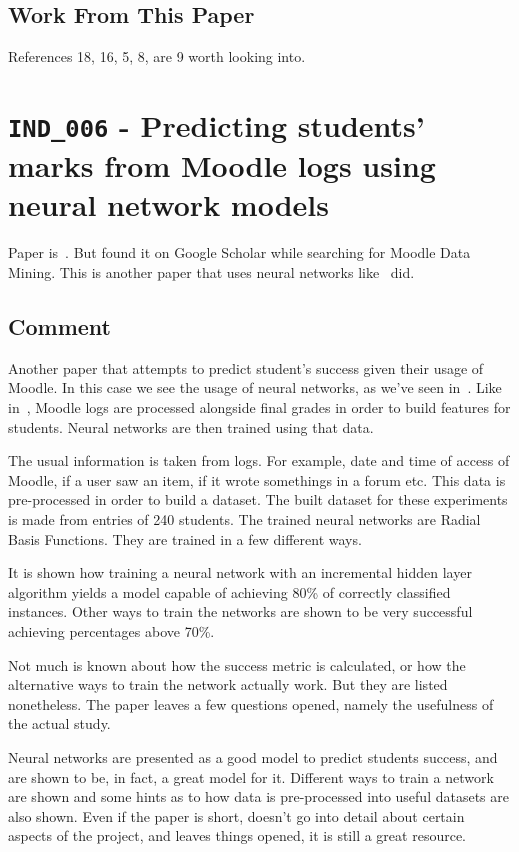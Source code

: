 \subsection{Work From This Paper}

References 18, 16, 5, 8, are 9 worth looking into.

\section{\texttt{IND\_006} - Predicting students' marks from Moodle logs using
neural network models}

Paper is~\cite{ind_006}. But found it on Google Scholar while searching for
Moodle Data Mining. This is another paper that uses neural networks
like~\cite{ind_003} did.

\subsection{Comment}

Another paper that attempts to predict student's success given their usage of
Moodle. In this case we see the usage of neural networks, as we've seen
in~\cite{ind_003}. Like in~\cite{ind_001, ind_002, ind_004, ind_005}, Moodle
logs are processed alongside final grades in order to build features for
students.  Neural networks are then trained using that data.

The usual information is taken from logs. For example, date and time of access
of Moodle, if a user saw an item, if it wrote somethings in a forum etc. This
data is pre-processed in order to build a dataset. The built dataset for these
experiments is made from entries of 240 students. The trained neural networks
are Radial Basis Functions. They are trained in a few different ways.

It is shown how training a neural network with an incremental hidden layer
algorithm yields a model capable of achieving 80\% of correctly classified
instances. Other ways to train the networks are shown to be very successful
achieving percentages above 70\%.

Not much is known about how the success metric is calculated, or how the
alternative ways to train the network actually work. But they are listed
nonetheless. The paper leaves a few questions opened, namely the usefulness of
the actual study.

Neural networks are presented as a good model to predict students success, and
are shown to be, in fact, a great model for it. Different ways to train a
network are shown and some hints as to how data is pre-processed into useful
datasets are also shown. Even if the paper is short, doesn't go into detail
about certain aspects of the project, and leaves things opened, it is still a
great resource.

